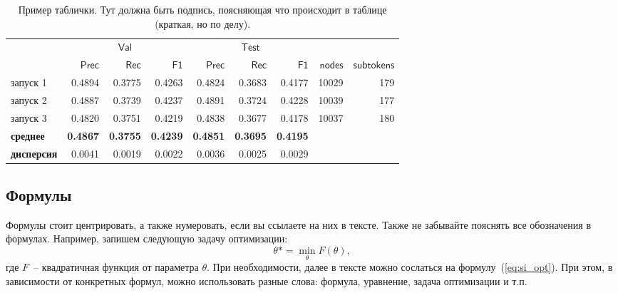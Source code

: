 \documentclass[a4paper,12pt]{extarticle}
\begin{document}
\begin{table}[ht]
    \caption{Пример таблички. Тут должна быть подпись, поясняющая что происходит в таблице (краткая, но по делу).}
    \label{table:long_epochs}
    \footnotesize
    \centering
    \begin{tabular}{lrrrrrrrr}
        \toprule
                       & \multicolumn{3}{c}{\(\mathsf{Val}\)} &
        \multicolumn{3}{c}{\(\mathsf{Test}\)}                                                                                                                                               \\
        \cmidrule(lr){2-4} \cmidrule(l){5-7}
        {}             & \(\mathsf{Prec}\)                    & \(\mathsf{Rec}\) & \(\mathsf{F1}\) & \(\mathsf{Prec}\) & \(\mathsf{Rec}\) & \(\mathsf{F1}\) & \(\mathsf{nodes}\) & \(\mathsf{subtokens}\) \\
        \midrule
        запуск 1       & 0.4894                             & 0.3775         & 0.4263        & 0.4824          & 0.3683         & 0.4177        & 10029            & 179                  \\
        запуск 2       & 0.4887                             & 0.3739         & 0.4237        & 0.4891          & 0.3724         & 0.4228        & 10039            & 177                  \\
        запуск 3       & 0.4820                             & 0.3751         & 0.4219        & 0.4838          & 0.3677         & 0.4178        & 10037            & 180                  \\
        \midrule
        \bf{среднее}   & \bf{0.4867}                        & \bf{0.3755}    & \bf{0.4239}   & \bf{ 0.4851}    & \bf{0.3695}    & \bf{0.4195}                                             \\
        \bf{дисперсия} & 0.0041                             & 0.0019         & 0.0022        & 0.0036          & 0.0025         & 0.0029                                                  \\
        \bottomrule
    \end{tabular}
\end{table}

\subsection{Формулы}

Формулы стоит центрировать, а также нумеровать, если вы ссылаете на них в тексте. Также не забывайте пояснять все обозначения в формулах. Например, запишем следующую задачу оптимизации:
\begin{equation}
    \label{eq:si_opt}
    \theta* = \min_{\theta} F(\theta),
\end{equation}
где \(F\)~-- квадратичная функция от параметра \(\theta\). При необходимости, далее в тексте можно сослаться на формулу~(\ref{eq:si_opt}). При этом, в зависимости от конкретных формул, можно использовать разные слова: формула, уравнение, задача оптимизации и т.п.
\end{document}
